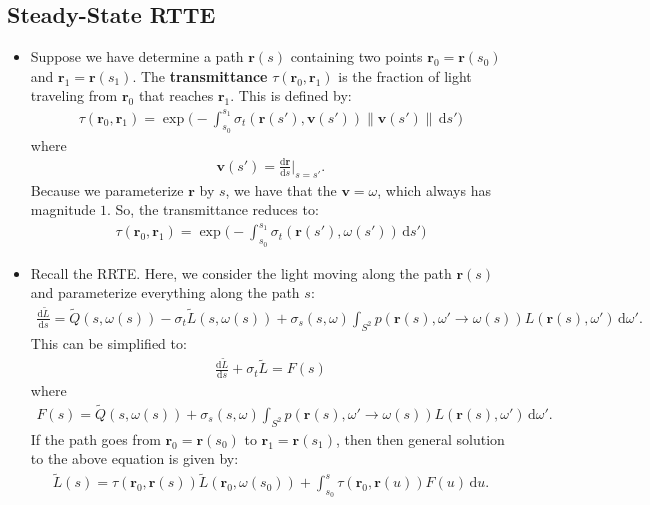 \documentclass[10pt]{article}
\newcommand{\dee}{\mathrm{d}}
\newcommand{\ve}[1]{\mathbf{#1}}
\newcommand{\ra}{\rightarrow}
\begin{document}
  \subsection{Steady-State RTTE}
  \begin{itemize}
    \item Suppose we have determine a path $\ve{r}(s)$ containing two points $\ve{r}_0 = \ve{r}(s_0)$and $\ve{r}_1 = \ve{r}(s_1)$. The \textbf{transmittance} $\tau(\ve{r}_0, \ve{r}_1)$ is the fraction of light traveling from $\ve{r}_0$ that reaches $\ve{r}_1$. This is defined by:
    \begin{align*}
      \tau(\ve{r}_0, \ve{r}_1) 
      = \exp \bigg( - \int_{s_0}^{s_1} \sigma_t(\ve{r}(s'), \ve{v}(s')) \| \ve{v}(s') \| \, \dee s' \bigg)
    \end{align*}
    where
    \begin{align*}
      \ve{v}(s') = \frac{\dee \ve{r}}{\dee s} \bigg|_{s=s'}.
    \end{align*}
    Because we parameterize $\ve{r}$ by $s$, we have that the $\ve{v} = \omega$, which always has magnitude $1$. So, the transmittance reduces to:
    \begin{align*}
      \tau(\ve{r}_0, \ve{r}_1) 
      = \exp \bigg( - \int_{s_0}^{s_1} \sigma_t(\ve{r}(s'), \omega(s')) \, \dee s' \bigg)
    \end{align*}

    \item Recall the RRTE. Here, we consider the light moving along the path $\ve{r}(s)$ and parameterize everything along the path $s$:
    \begin{align*}
      \frac{\dee \tilde L}{\dee s} = \tilde Q(s,\omega(s)) - \sigma_t \tilde L(s,\omega(s)) + \sigma_s(s,\omega) \int_{S^2} p(\ve{r}(s), \omega' \ra \omega(s)) L(\ve{r}(s), \omega') \, \dee \omega'.
    \end{align*}
    This can be simplified to:
    \begin{align*}
      \frac{\dee \tilde L}{\dee s} + \sigma_t \tilde L = F(s)
    \end{align*}
    where
    \begin{align*}
      F(s) = \tilde Q(s,\omega(s)) + \sigma_s(s,\omega) \int_{S^2} p(\ve{r}(s), \omega' \ra \omega(s)) L(\ve{r}(s), \omega') \, \dee \omega'.
    \end{align*}
    If the path goes from $\ve{r}_0 = \ve{r}(s_0)$ to $\ve{r}_1 = \ve{r}(s_1)$, then then general solution to the above equation is given by: 
    \begin{align*}
      \tilde L(s) 
      = \tau(\ve{r}_0, \ve{r}(s)) \tilde L(\ve{r}_0, \omega(s_0))
      + \int_{s_0}^s \tau(\ve{r}_0, \ve{r}(u)) F(u)\, \dee u.
    \end{align*}
  \end{itemize}
\end{document}
